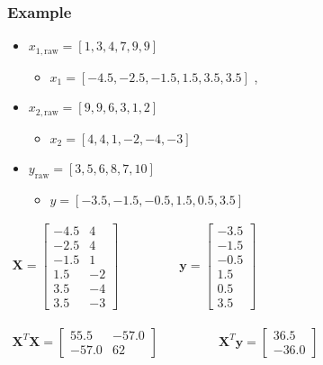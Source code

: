 \begin{frame}\frametitle{Example}
	\begin{itemize}
		\item	$x_{1,\text{raw}} = [1, 3, 4, 7, 9, 9]$ 
		\begin{itemize}
			\item	$x_1 = [-4.5, -2.5, -1.5 , 1.5 , 3.5, 3.5]$ , 
		\end{itemize}
		\item	$x_{2,\text{raw}} = [9, 9, 6, 3, 1, 2]$ 
		\begin{itemize}
			\item	$x_2 = [4, 4, 1, -2, -4, -3]$ 
		\end{itemize}
		\item	$y_{\text{raw}} = [3,5,6,8,7,10]$ 
		\begin{itemize}
			\item	$y = [-3.5, -1.5, -0.5, 1.5, 0.5, 3.5]$ 
		\end{itemize}
	\end{itemize}
	
	$ 
	\begin{array}{lr}
		\mathbf{X} = 
		\begin{bmatrix}
			-4.5 & 4\\
			-2.5 & 4 \\
			-1.5 & 1 \\
			1.5 & -2 \\
			3.5 & -4 \\
			3.5 & -3 
		\end{bmatrix}
		&\qquad\qquad \mathbf{y} = 
		\begin{bmatrix}
			-3.5 \\
			-1.5\\
			-0.5\\
			1.5\\
			0.5\\
			3.5 
		\end{bmatrix}
	\end{array}
	$
	
	$ 
	\begin{array}{lr}
		\mathbf{X}^T\mathbf{X} = 
		\begin{bmatrix}
			55.5 & -57.0 \\-57.0 & 62
		\end{bmatrix}
		&\qquad\qquad \mathbf{X}^T\mathbf{y} = 
		\begin{bmatrix}
			36.5 \\
			-36.0 
		\end{bmatrix}
	\end{array}
	$
\end{frame}

